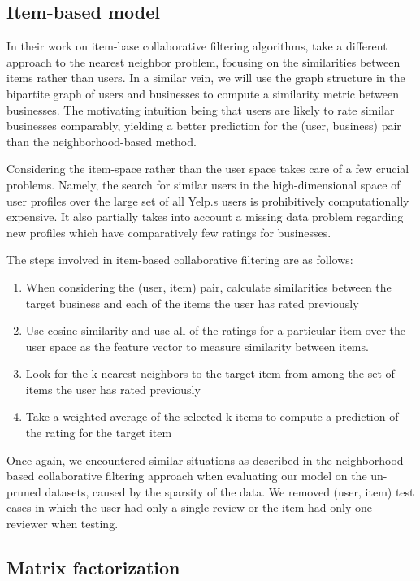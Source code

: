 \documentclass[letterpaper, 10 pt, twocolumn]{article}
\begin{document}
\subsection{Item-based model}

In their work on item-base collaborative filtering algorithms,
\cite{bib:sarwar} take a different approach to the nearest
neighbor problem, focusing on the similarities between items rather than
users. In a similar vein, we will use the graph structure in the bipartite
graph of users and businesses to compute a similarity metric between
businesses. The motivating intuition being that users are likely to rate
similar businesses comparably, yielding a better prediction for the (user,
business) pair than the neighborhood-based method.

Considering the item-space rather than the user space takes care of a few
crucial problems. Namely, the search for similar users in the
high-dimensional space of user profiles over the large set of all Yelp.s
users is prohibitively computationally expensive. It also partially takes
into account a missing data problem regarding new profiles which have
comparatively few ratings for businesses.

The steps involved in item-based collaborative filtering are as follows:
\begin{enumerate}
\item When considering the (user, item) pair, calculate similarities between
  the target business and each of the items the user has rated previously
\item Use cosine similarity and use all of the ratings for a particular item
  over the user space as the feature vector to measure similarity between
  items.
\item Look for the k nearest neighbors to the target item from among the set of
  items the user has rated previously
\item Take a weighted average of the selected k items to compute a prediction
  of the rating for the target item
\end{enumerate}

Once again, we encountered similar situations as described in the
neighborhood-based collaborative filtering approach when evaluating our
model on the un-pruned datasets, caused by the sparsity of the data. We
removed (user, item) test cases in which the user had only a single review
or the item had only one reviewer when testing.

\subsection{Matrix factorization}
\end{document}
